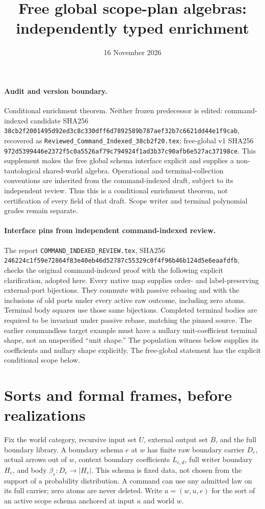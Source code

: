 \documentclass[11pt]{article}
\title{Free global scope-plan algebras: independently typed enrichment}
\date{16 November 2026}
\begin{document}
\maketitle
\paragraph{Audit and version boundary.} Conditional enrichment theorem. Neither frozen predecessor is edited: command-indexed candidate SHA256 \texttt{38cb2f2001495d92ed3c8c330dff6d7892589b787aef32b7c6621dd44e1f9cab}, recovered as \texttt{Reviewed\_Command\_Indexed\_38cb2f20.tex}; free-global v1 SHA256 \texttt{972d5399446e2372f5c0a5526af79c794924f1ad3b37c90afb6e527ac37198ce}. This supplement makes the free global schema interface explicit and supplies a non-tautological shared-world algebra. Operational and terminal-collection conventions are inherited from the command-indexed draft, subject to its independent review. Thus this is a conditional enrichment theorem, not certification of every field of that draft. Scope writer and terminal polynomial grades remain separate.

\paragraph{Interface pins from independent command-indexed review.} The report \texttt{COMMAND\_INDEXED\_REVIEW.tex}, SHA256 \texttt{246224c1f59e72864f83e40eb46d52787c55329c0f4f96b46b124d5e6eaafdfb}, checks the original command-indexed proof with the following explicit clarification, adopted here. Every native map supplies order- and label-preserving external-port bijections. They commute with passive rebasing and with the inclusions of old ports under every active raw outcome, including zero atoms. Terminal body squares use those same bijections. Completed terminal bodies are required to be invariant under passive rebase, matching the pinned source. The earlier commandless target example must have a nullary unit-coefficient terminal shape, not an unspecified ``unit shape.'' The population witness below supplies its coefficients and nullary shape explicitly. The free-global statement has the explicit conditional scope below.

\section{Sorts and formal frames, before realizations}
Fix the world category, recursive input set $U$, external output set $B$, and the full boundary library. A boundary schema $e$ at $w$ has finite raw boundary carrier $D_e$, actual arrows out of $w$, context boundary coefficients $L_{e,d}$, full writer boundary $H_e$, and body $\beta_e:D_e\to |H_e|$. This schema is fixed data, not chosen from the support of a probability distribution. A command can use any admitted law on its full carrier; zero atoms are never deleted. Write $a=(w,u,e)$ for the sort of an active scope schema anchored at input $u$ and world $w$.
\end{document}
